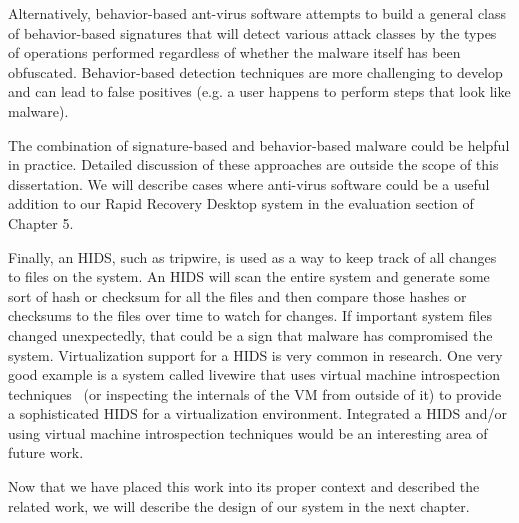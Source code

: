 Alternatively, behavior-based ant-virus software attempts to build a general class of behavior-based signatures that will detect various attack classes by the types of operations performed regardless of whether the malware itself has been obfuscated. Behavior-based detection techniques are more challenging to develop and can lead to false positives (e.g. a user happens to perform steps that look like malware).

The combination of signature-based and behavior-based malware could be helpful in practice. Detailed discussion of these approaches are outside the scope of this dissertation. We will describe cases where anti-virus software could be a useful addition to our Rapid Recovery Desktop system in the evaluation section of Chapter 5.

Finally, an HIDS, such as tripwire\cite{kim_1994}, is used as a way to keep track of all changes to files on the system. An HIDS will scan the entire system and generate some sort of hash or checksum for all the files and then compare those hashes or checksums to the files over time to watch for changes. If important system files changed unexpectedly, that could be a sign that malware has compromised the system. Virtualization support for a HIDS is very common in research. One very good example is a system called livewire\cite{VMI_IDS_2003} that uses virtual machine introspection techniques~\cite{xenaccess_07,vmsafe_news_2008} (or inspecting the internals of the VM from outside of it) to provide a sophisticated HIDS for a virtualization environment. Integrated a HIDS and/or using virtual machine introspection techniques would be an interesting area of future work.

Now that we have placed this work into its proper context and described the related work, we will describe the design of our system in the next chapter.



